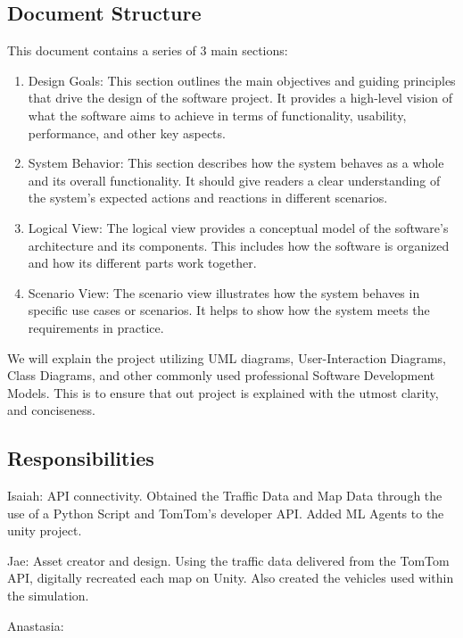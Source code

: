 \subsection{Document Structure}

This document contains a series of 3 main sections:
\begin{enumerate}
    \item Design Goals: This section outlines the main objectives and guiding principles that drive the design of the software project. 
    It provides a high-level vision of what the software aims to achieve in terms of functionality, usability, performance, and other key aspects.
    
    \item System Behavior: This section describes how the system behaves as a whole and its overall functionality. 
    It should give readers a clear understanding of the system's expected actions and reactions in different scenarios.
    
    \item Logical View: The logical view provides a conceptual model of the software's architecture and its components. 
    This includes how the software is organized and how its different parts work together.

    \item Scenario View: The scenario view illustrates how the system behaves in specific use cases or scenarios. 
    It helps to show how the system meets the requirements in practice.
\end{enumerate}

We will explain the project utilizing UML diagrams, User-Interaction Diagrams, Class Diagrams, and other commonly used professional Software Development Models.
This is to ensure that out project is explained with the utmost clarity, and conciseness.

\subsection{Responsibilities}

Isaiah: API connectivity.
Obtained the Traffic Data and Map Data through the use of a Python Script and TomTom's developer API.
Added ML Agents to the unity project.

Jae: Asset creator and design.
Using the traffic data delivered from the TomTom API, digitally recreated each map on Unity. Also created the vehicles used within the simulation.

Anastasia: 
